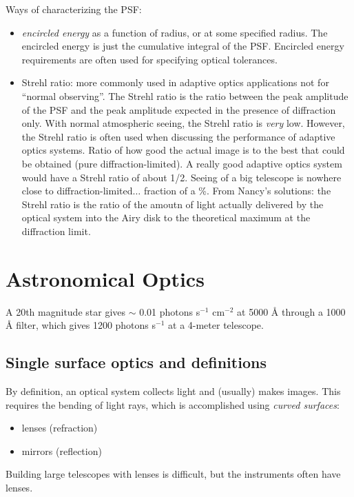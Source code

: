 \documentclass[12pt]{article}
\begin{document}
Ways of characterizing the PSF:
\begin{itemize}
    \item \emph{encircled energy} as a function of radius,
        or at some specified radius. The encircled energy is just the
        cumulative integral of the PSF\@. Encircled energy requirements
        are often used for specifying optical tolerances.
    \item Strehl ratio: more commonly used in
        adaptive optics applications \textcolor{myBlue}{not for
        ``normal observing''}. The Strehl ratio is
        the ratio between the peak amplitude of the PSF and the peak amplitude
        expected in the presence of diffraction only. With normal atmospheric
        seeing, the Strehl ratio is \emph{very} low. However, the Strehl ratio is
        often used when discussing the performance of adaptive optics
        systems. \textcolor{myBlue}{Ratio of how good the actual image is to
        the best that could be obtained (pure diffraction-limited).
        A really good adaptive optics system would have a Strehl ratio
        of about 1/2. Seeing of a big telescope is nowhere close to
        diffraction-limited$\ldots$ fraction of a \%.}
        From Nancy's solutions: the Strehl ratio is the ratio of the
        amoutn of light actually delivered by the optical system into
        the Airy disk to the theoretical maximum at the diffraction limit.

\end{itemize}

\newpage
\section{Astronomical Optics}
A 20th magnitude star gives $\sim$ 0.01 photons s$^{-1}$ cm$^{-2}$
at 5000 \AA{} through a 1000 \AA{} filter, which gives 1200
photons s$^{-1}$ at a 4-meter telescope.
\subsection{Single surface optics and definitions}
By definition, an optical system collects light
and (usually) makes images. This requires the bending
of light rays, which is accomplished using \emph{curved surfaces}:
\begin{itemize}
    \item lenses (refraction)
    \item mirrors (reflection)
\end{itemize}
Building large telescopes with lenses is difficult, but the
instruments often have lenses.
\end{document}
